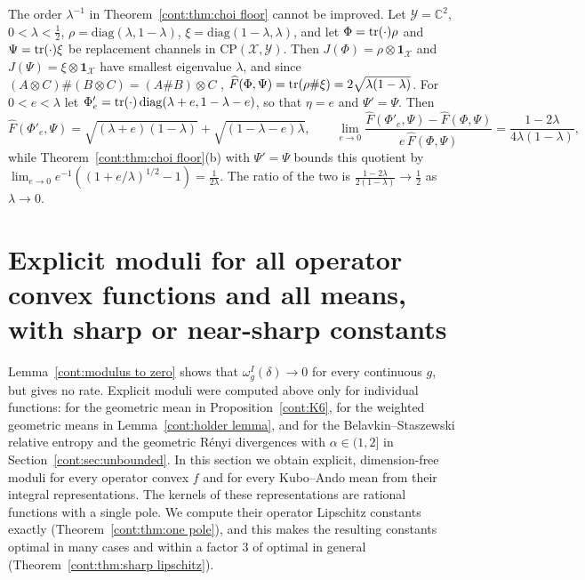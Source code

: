 \begin{example}\label{cont:ex:choi floor sharp}
The order $\lambda^{-1}$ in Theorem~\ref{cont:thm:choi floor} cannot be improved. Let $\mathcal{Y}=\mathbb{C}^2$, $0<\lambda<\frac12$, $\rho=\mathrm{diag}(\lambda,1-\lambda)$, $\xi=\mathrm{diag}(1-\lambda,\lambda)$, and let $\Phi=\operatorname{tr}(\cdot)\rho$ and $\Psi=\operatorname{tr}(\cdot)\xi$ be replacement channels in $\mathrm{CP}(\mathcal{X},\mathcal{Y})$. Then $J(\Phi)=\rho\otimes\mathbf{1}_{\mathcal{X}}$ and $J(\Psi)=\xi\otimes\mathbf{1}_{\mathcal{X}}$ have smallest eigenvalue $\lambda$, and since $(A\otimes C)\#(B\otimes C)=(A\#B)\otimes C$ \cite{KuboAndo1980}, $\widehat{F}(\Phi,\Psi)=\operatorname{tr}(\rho\#\xi)=2\sqrt{\lambda(1-\lambda)}$. For $0<e<\lambda$ let $\Phi'_e=\operatorname{tr}(\cdot)\,\mathrm{diag}(\lambda+e,1-\lambda-e)$, so that $\eta=e$ and $\Psi'=\Psi$. Then
\[
\widehat{F}(\Phi'_e,\Psi)=\sqrt{(\lambda+e)(1-\lambda)}+\sqrt{(1-\lambda-e)\lambda},\qquad\lim_{e\to0}\frac{\widehat{F}(\Phi'_e,\Psi)-\widehat{F}(\Phi,\Psi)}{e\,\widehat{F}(\Phi,\Psi)}=\frac{1-2\lambda}{4\lambda(1-\lambda)},
\]
while Theorem~\ref{cont:thm:choi floor}(b) with $\Psi'=\Psi$ bounds this quotient by $\lim_{e\to0}e^{-1}((1+e/\lambda)^{1/2}-1)=\frac1{2\lambda}$. The ratio of the two is $\frac{1-2\lambda}{2(1-\lambda)}\to\frac12$ as $\lambda\to0$.
\end{example}

\section{Explicit moduli for all operator convex functions and all means, with sharp or near-sharp constants}\label{cont:sec:loewner}
 
Lemma~\ref{cont:modulus to zero} shows that $\omega^I_g(\delta)\to0$ for every continuous $g$, but gives no rate. Explicit moduli were computed above only for individual functions: for the geometric mean in Proposition~\ref{cont:K6}, for the weighted geometric means in Lemma~\ref{cont:holder lemma}, and for the Belavkin--Staszewski relative entropy and the geometric R\'enyi divergences with $\alpha\in(1,2]$ in Section~\ref{cont:sec:unbounded}. In this section we obtain explicit, dimension-free moduli for every operator convex $f$ and for every Kubo--Ando mean from their integral representations. The kernels of these representations are rational functions with a single pole. We compute their operator Lipschitz constants exactly (Theorem~\ref{cont:thm:one pole}), and this makes the resulting constants optimal in many cases and within a factor $3$ of optimal in general (Theorem~\ref{cont:thm:sharp lipschitz}).
 
